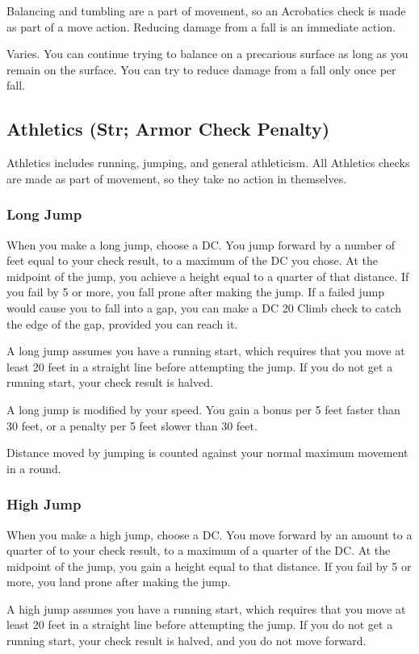  Balancing and tumbling are a part of movement, so an Acrobatics check is made as part of a move action. Reducing damage from a fall is an immediate action.

 Varies. You can continue trying to balance on a precarious surface as long as you remain on the surface. You can try to reduce damage from a fall only once per fall.


\subsection{Athletics (Str; Armor Check Penalty)}
Athletics includes running, jumping, and general athleticism. All Athletics checks are made as part of movement, so they take no action in themselves.

\subsubsection{Long Jump}
When you make a long jump, choose a DC. You jump forward by a number of feet equal to your check result, to a maximum of the DC you chose. At the midpoint of the jump, you achieve a height equal to a quarter of that distance. If you fail by 5 or more, you fall prone after making the jump. If a failed jump would cause you to fall into a gap, you can make a DC 20 Climb check to catch the edge of the gap, provided you can reach it. 

A long jump assumes you have a running start, which requires that you move at least 20 feet in a straight line before attempting the jump. If you do not get a running start, your check result is halved.

A long jump is modified by your speed. You gain a  bonus per 5 feet faster than 30 feet, or a  penalty per 5 feet slower than 30 feet.

Distance moved by jumping is counted against your normal maximum movement in a round.

\subsubsection{High Jump}
When you make a high jump, choose a DC. You move forward by an amount to a quarter of to your check result, to a maximum of a quarter of the DC. At the midpoint of the jump, you gain a height equal to that distance. If you fail by 5 or more, you land prone after making the jump.

A high jump assumes you have a running start, which requires that you move at least 20 feet in a straight line before attempting the jump. If you do not get a running start, your check result is halved, and you do not move forward.

